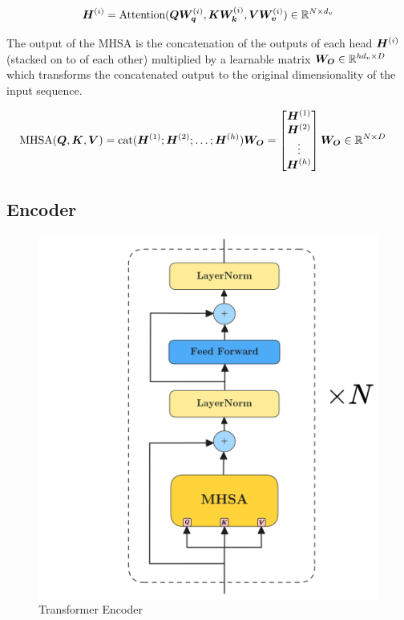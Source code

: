 \documentclass[../../main.tex]{subfiles}
\begin{document}
\begin{equation}
	\bm{H}^{(i)} = \text{Attention}(\bm{Q}\bm{W_q}^{(i)}, \bm{K}\bm{W_k}^{(i)}, \bm{V}\bm{W_v}^{(i)}) \in \mathbb{R}^{N \times d_v}
\end{equation}

The output of the MHSA is the concatenation of the outputs of each head $\bm{H}^{(i)}$ (stacked on to of each other) multiplied by a learnable matrix $\bm{W_O} \in \mathbb{R}^{hd_v \times D}$ which transforms the concatenated output to the original dimensionality of the input sequence.

\begin{align*}
	 \text{MHSA}(\bm{Q}, \bm{K}, \bm{V}) &= \text{cat}(\bm{H}^{(1)}; \bm{H}^{(2)}; \dots; \bm{H}^{(h)})\bm{W_O} 
	= \begin{bmatrix}
		\bm{H}^{(1)} \\
		\bm{H}^{(2)} \\
		\vdots \\
		\bm{H}^{(h)}
	\end{bmatrix} \bm{W_O} \in \mathbb{R}^{N \times D}
\end{align*}



\subsection{Encoder}

\begin{figure}[H]
	\centering
	\includegraphics[height=0.5\textwidth]{./encoder.png}
	\caption{Transformer Encoder \parencite{vaswani2017attention}}
	\label{fig:encoder}
\end{figure}
\end{document}
